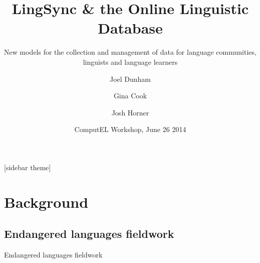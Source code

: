 \documentclass{beamer}
\begin{document}
\title[LingSync \& OLD] %
{LingSync \& the Online Linguistic Database}



\author[~]{Joel Dunham  \and Gina Cook  \and Josh Horner }


                      \subtitle
                      {New models for the collection and management of data for language communities, linguists and
                      language learners}



\date[ComputEL 2014] %
{ComputEL Workshop, June 26 2014}



%

\begin{frame}
\titlepage
\end{frame}
[sidebar theme]

\section{Background}

\subsection[Fieldwork]{Endangered languages fieldwork}\label{sec:fieldwork}

\begin{frame}
Endangered languages fieldwork
\end{frame}
\end{document}
